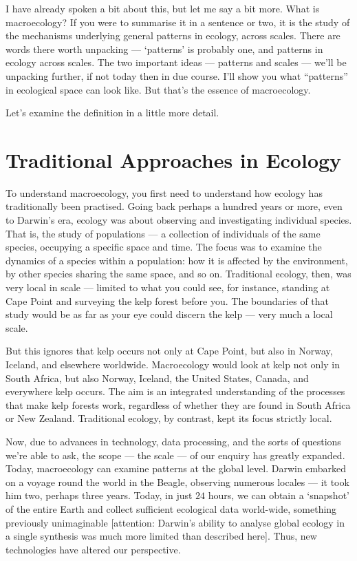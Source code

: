 \documentclass[
  12pt,
]{book}
\begin{document}
I have already spoken a bit about this, but let me say a bit more. What
is macroecology? If you were to summarise it in a sentence or two, it is
the study of the mechanisms underlying general patterns in ecology,
across scales. There are words there worth unpacking --- `patterns' is
probably one, and patterns in ecology across scales. The two important
ideas --- patterns and scales --- we'll be unpacking further, if not
today then in due course. I'll show you what ``patterns'' in ecological
space can look like. But that's the essence of macroecology.

Let's examine the definition in a little more detail.

\section{Traditional Approaches in
Ecology}\label{traditional-approaches-in-ecology}

To understand macroecology, you first need to understand how ecology has
traditionally been practised. Going back perhaps a hundred years or
more, even to Darwin's era, ecology was about observing and
investigating individual species. That is, the study of populations ---
a collection of individuals of the same species, occupying a specific
space and time. The focus was to examine the dynamics of a species
within a population: how it is affected by the environment, by other
species sharing the same space, and so on. Traditional ecology, then,
was very local in scale --- limited to what you could see, for instance,
standing at Cape Point and surveying the kelp forest before you. The
boundaries of that study would be as far as your eye could discern the
kelp --- very much a local scale.

But this ignores that kelp occurs not only at Cape Point, but also in
Norway, Iceland, and elsewhere worldwide. Macroecology would look at
kelp not only in South Africa, but also Norway, Iceland, the United
States, Canada, and everywhere kelp occurs. The aim is an integrated
understanding of the processes that make kelp forests work, regardless
of whether they are found in South Africa or New Zealand. Traditional
ecology, by contrast, kept its focus strictly local.

Now, due to advances in technology, data processing, and the sorts of
questions we're able to ask, the scope --- the scale --- of our enquiry
has greatly expanded. Today, macroecology can examine patterns at the
global level. Darwin embarked on a voyage round the world in the Beagle,
observing numerous locales --- it took him two, perhaps three years.
Today, in just \(24\) hours, we can obtain a `snapshot' of the entire
Earth and collect sufficient ecological data world-wide, something
previously unimaginable {[}attention: Darwin's ability to analyse global
ecology in a single synthesis was much more limited than described
here{]}. Thus, new technologies have altered our perspective.
\end{document}
